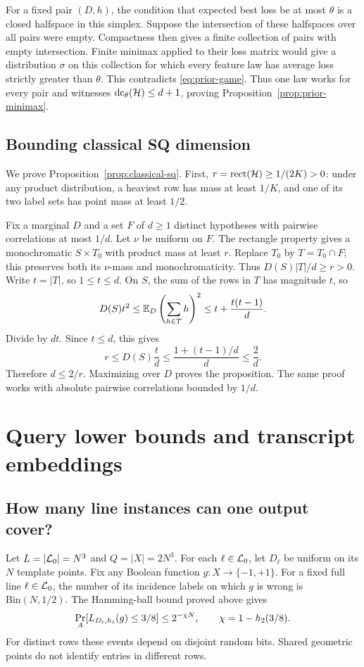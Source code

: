 For a fixed pair $(D,h)$, the condition that expected best loss be at most $\theta$ is a closed halfspace in this simplex. Suppose the intersection of these halfspaces over all pairs were empty. Compactness then gives a finite collection of pairs with empty intersection. Finite minimax applied to their loss matrix would give a distribution $\sigma$ on this collection for which every feature law has average loss strictly greater than $\theta$. This contradicts \eqref{eq:prior-game}. Thus one law works for every pair and witnesses $\operatorname{dc}_\theta(\mathcal H)\le d+1$, proving Proposition~\ref{prop:prior-minimax}.

\subsection{Bounding classical SQ dimension}
We prove Proposition~\ref{prop:classical-sq}. First, $r=\operatorname{rect}(\mathcal H)\ge1/(2K)>0$: under any product distribution, a heaviest row has mass at least $1/K$, and one of its two label sets has point mass at least $1/2$.

Fix a marginal $D$ and a set $F$ of $d\ge1$ distinct hypotheses with pairwise correlations at most $1/d$. Let $\nu$ be uniform on $F$. The rectangle property gives a monochromatic $S\times T_0$ with product mass at least $r$. Replace $T_0$ by $T=T_0\cap F$; this preserves both its $\nu$-mass and monochromaticity. Thus $D(S)|T|/d\ge r>0$. Write $t=|T|$, so $1\le t\le d$. On $S$, the sum of the rows in $T$ has magnitude $t$, so
\[
 D(S)t^2
 \le\mathbb E_D\left(\sum_{h\in T}h\right)^2
 \le t+\frac{t(t-1)}d.
\]
Divide by $dt$. Since $t\le d$, this gives
\[
 r\le D(S)\frac td
 \le\frac{1+(t-1)/d}{d}\le\frac2d.
\]
Therefore $d\le2/r$. Maximizing over $D$ proves the proposition. The same proof works with absolute pairwise correlations bounded by $1/d$.

\section{Query lower bounds and transcript embeddings}
\label{app:query}
\subsection{How many line instances can one output cover?}
Let $L=|\mathcal L_0|=N^3$ and $Q=|X|=2N^3$. For each $\ell\in\mathcal L_0$, let $D_\ell$ be uniform on its $N$ template points. Fix any Boolean function $g:X\to\{-1,+1\}$. For a fixed full line $\ell\in\mathcal L_0$, the number of its incidence labels on which $g$ is wrong is $\mathrm{Bin}(N,1/2)$. The Hamming-ball bound proved above gives
\begin{equation}
 \Pr_A[L_{D_\ell,h_\ell}(g)\le3/8]\le2^{-\chi N},
 \qquad \chi=1-h_2(3/8).
\label{eq:fixed-output}
\end{equation}
For distinct rows these events depend on disjoint random bits. Shared geometric points do not identify entries in different rows.

